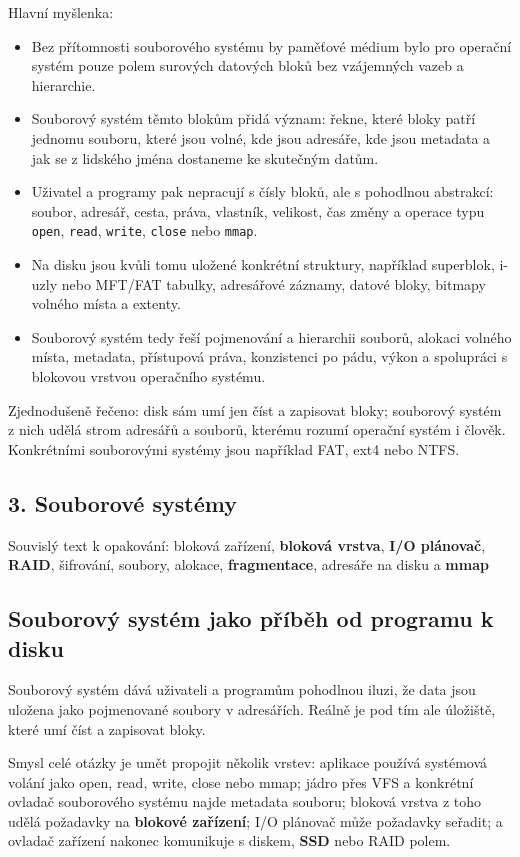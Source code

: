 \documentclass[11pt,a4paper]{article}
\begin{document}
Hlavní myšlenka:
\begin{itemize}
  \item Bez přítomnosti souborového systému by paměťové médium bylo pro operační systém pouze polem surových datových bloků bez vzájemných vazeb a hierarchie.
  \item Souborový systém těmto blokům přidá význam: řekne, které bloky patří jednomu souboru, které jsou volné, kde jsou adresáře, kde jsou metadata a jak se z lidského jména dostaneme ke skutečným datům.
  \item Uživatel a programy pak nepracují s čísly bloků, ale s pohodlnou abstrakcí: soubor, adresář, cesta, práva, vlastník, velikost, čas změny a operace typu \texttt{open}, \texttt{read}, \texttt{write}, \texttt{close} nebo \texttt{mmap}.
  \item Na disku jsou kvůli tomu uložené konkrétní struktury, například superblok, i-uzly nebo MFT/FAT tabulky, adresářové záznamy, datové bloky, bitmapy volného místa a extenty.
  \item Souborový systém tedy řeší pojmenování a hierarchii souborů, alokaci volného místa, metadata, přístupová práva, konzistenci po pádu, výkon a spolupráci s blokovou vrstvou operačního systému.
\end{itemize}
Zjednodušeně řečeno: disk sám umí jen číst a zapisovat bloky; souborový systém z nich udělá strom adresářů a souborů, kterému rozumí operační systém i člověk. Konkrétními souborovými systémy jsou například FAT, ext4 nebo NTFS.

\subsection*{3. Souborové systémy}

Souvislý text k opakování: bloková zařízení, \textbf{bloková vrstva}, \textbf{I/O plánovač}, \textbf{RAID}, šifrování, soubory, alokace, \textbf{fragmentace}, adresáře na disku a \textbf{mmap}

\subsection*{Souborový systém jako příběh od programu k disku}

Souborový systém dává uživateli a programům pohodlnou iluzi, že data jsou uložena jako pojmenované soubory v adresářích. Reálně je pod tím ale úložiště, které umí číst a zapisovat bloky.

Smysl celé otázky je umět propojit několik vrstev: aplikace používá systémová volání jako open, read, write, close nebo mmap; jádro přes VFS a konkrétní ovladač souborového systému najde metadata souboru; bloková vrstva z toho udělá požadavky na \textbf{blokové zařízení}; I/O plánovač může požadavky seřadit; a ovladač zařízení nakonec komunikuje s diskem, \textbf{SSD} nebo RAID polem.
\end{document}
